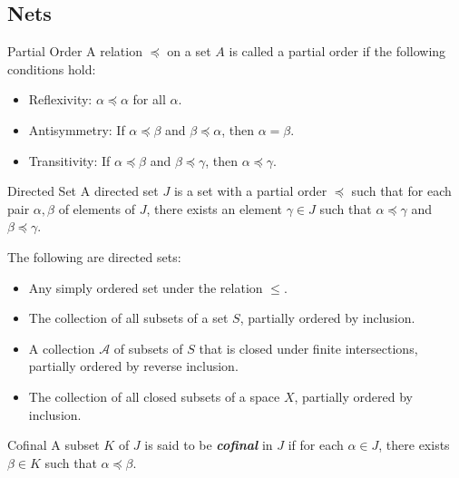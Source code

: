 \documentclass[12pt,a4paper]{article}
\begin{document}
    \subsection{Nets}
    \begin{defi}{Partial Order}
        A relation $\preceq$ on a set $A$ is called a partial order if the following conditions hold:
        \begin{itemize}
            \item Reflexivity: $\alpha\preceq\alpha$ for all $\alpha$.
            \item Antisymmetry: If $\alpha\preceq\beta$ and $\beta\preceq\alpha$, then $\alpha=\beta$.
            \item Transitivity: If $\alpha\preceq\beta$ and $\beta\preceq\gamma$, then $\alpha\preceq\gamma$.
        \end{itemize}
    \end{defi}
    \hfill

    \begin{defi}{Directed Set}
        A directed set $J$ is a set with a partial order $\preceq$ such that for each pair $\alpha,\beta$ of elements of $J$, there exists an element $\gamma\in J$ such that $\alpha\preceq\gamma$ and $\beta\preceq\gamma$.
    \end{defi}

    \begin{eg}
        The following are directed sets:
        \begin{itemize}
            \item Any simply ordered set under the relation $\leq$.
            \item The collection of all subsets of a set $S$, partially ordered by inclusion.
            \item A collection $\mathcal{A}$ of subsets of $S$ that is closed under finite intersections, partially ordered by reverse inclusion.
            \item The collection of all closed subsets of a space $X$, partially ordered by inclusion.
        \end{itemize}
    \end{eg}
    \hfill

    \begin{defi}{Cofinal}
        A subset $K$ of $J$ is said to be \textbf{\textit{cofinal}} in $J$ if for each $\alpha\in J$, there exists $\beta\in K$ such that $\alpha\preceq\beta$.
    \end{defi}
    
\end{document}
